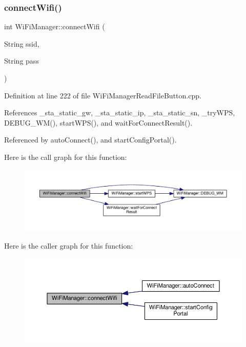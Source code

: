 \subsubsection{\texorpdfstring{connect\+Wifi()}{connectWifi()}}
{\footnotesize\ttfamily int Wi\+Fi\+Manager\+::connect\+Wifi (\begin{DoxyParamCaption}\item[{String}]{ssid,  }\item[{String}]{pass }\end{DoxyParamCaption})\hspace{0.3cm}{\ttfamily [private]}}



Definition at line 222 of file Wi\+Fi\+Manager\+Read\+File\+Button.\+cpp.



References \+\_\+sta\+\_\+static\+\_\+gw, \+\_\+sta\+\_\+static\+\_\+ip, \+\_\+sta\+\_\+static\+\_\+sn, \+\_\+try\+W\+PS, D\+E\+B\+U\+G\+\_\+\+W\+M(), start\+W\+P\+S(), and wait\+For\+Connect\+Result().



Referenced by auto\+Connect(), and start\+Config\+Portal().

Here is the call graph for this function\+:\nopagebreak
\begin{figure}[H]
\begin{center}
\leavevmode
\includegraphics[width=350pt]{d4/dc8/class_wi_fi_manager_ae0ae27b5543b47585728c084c3bbdca7_cgraph}
\end{center}
\end{figure}
Here is the caller graph for this function\+:\nopagebreak
\begin{figure}[H]
\begin{center}
\leavevmode
\includegraphics[width=350pt]{d4/dc8/class_wi_fi_manager_ae0ae27b5543b47585728c084c3bbdca7_icgraph}
\end{center}
\end{figure}
\mbox{\label{class_wi_fi_manager_a89a3f33997aa662ad223d6c150c1eede}} 
